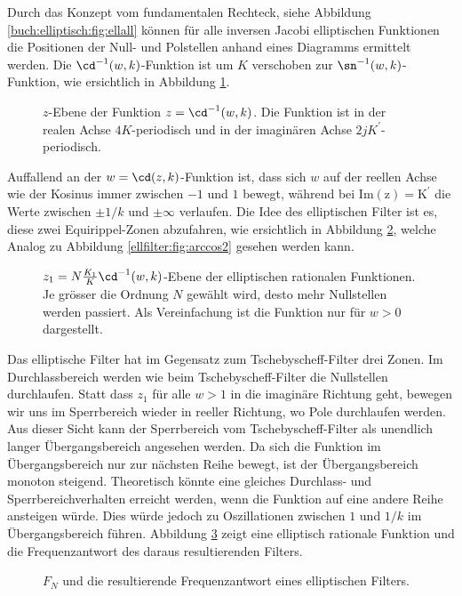 Durch das Konzept vom fundamentalen Rechteck, siehe Abbildung \ref{buch:elliptisch:fig:ellall} können für alle inversen Jacobi elliptischen Funktionen die Positionen der Null- und Polstellen anhand eines Diagramms ermittelt werden.
Die $\cd^{-1}(w, k)$-Funktion ist um $K$ verschoben zur $\sn^{-1}(w, k)$-Funktion, wie ersichtlich in Abbildung \ref{ellfilter:fig:cd}.
\begin{figure}
    \centering
    
    \caption{
        $z$-Ebene der Funktion $z = \cd^{-1}(w, k)$.
        Die Funktion ist in der realen Achse $4K$-periodisch und in der imaginären Achse $2jK^\prime$-periodisch.
    }
    \label{ellfilter:fig:cd}
\end{figure}
Auffallend an der $w = \cd(z, k)$-Funktion ist, dass sich $w$ auf der reellen Achse wie der Kosinus immer zwischen $-1$ und $1$ bewegt, während bei $\mathrm{Im(z) = K^\prime}$ die Werte zwischen $\pm 1/k$ und $\pm \infty$ verlaufen.
Die Idee des elliptischen Filter ist es, diese zwei Equirippel-Zonen abzufahren, wie ersichtlich in Abbildung \ref{ellfilter:fig:cd2}, welche Analog zu Abbildung \ref{ellfilter:fig:arccos2} gesehen werden kann.
\begin{figure}
    \centering
    
    \caption{
        $z_1=N\frac{K_1}{K}\cd^{-1}(w, k)$-Ebene der elliptischen rationalen Funktionen.
        Je grösser die Ordnung $N$ gewählt wird, desto mehr Nullstellen werden passiert.
        Als Vereinfachung ist die Funktion nur für $w>0$ dargestellt.
    }
    \label{ellfilter:fig:cd2}
\end{figure}
Das elliptische Filter hat im Gegensatz zum Tschebyscheff-Filter drei Zonen.
Im Durchlassbereich werden wie beim Tschebyscheff-Filter die Nullstellen durchlaufen.
Statt dass $z_1$ für alle $w>1$ in die imaginäre Richtung geht, bewegen wir uns im Sperrbereich wieder in reeller Richtung, wo Pole durchlaufen werden.
Aus dieser Sicht kann der Sperrbereich vom Tschebyscheff-Filter als unendlich langer Übergangsbereich angesehen werden.
Da sich die Funktion im Übergangsbereich nur zur nächsten Reihe bewegt, ist der Übergangsbereich monoton steigend.
Theoretisch könnte eine gleiches Durchlass- und Sperrbereichverhalten erreicht werden, wenn die Funktion auf eine andere Reihe ansteigen würde.
Dies würde jedoch zu Oszillationen zwischen $1$ und $1/k$ im Übergangsbereich führen.
Abbildung \ref{ellfilter:fig:elliptic_freq} zeigt eine elliptisch rationale Funktion und die Frequenzantwort des daraus resultierenden Filters.
\begin{figure}
    \centering
    
    \caption{$F_N$ und die resultierende Frequenzantwort eines elliptischen Filters.}
    \label{ellfilter:fig:elliptic_freq}
\end{figure}

